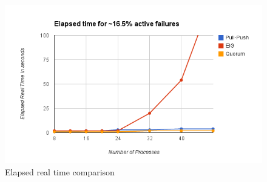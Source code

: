 \begin{figure}[ht]
 \centering
\vspace{-3mm}
\includegraphics[scale=0.4]{elapsed16}
\caption{Elapsed real time comparison}
 \label{fig:elapsed}
\vspace{-9mm}
\end{figure}


%




